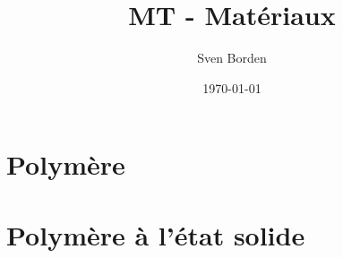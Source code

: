 \documentclass[12pt]{report}
\title{MT - Matériaux}
\author{Sven Borden}
\date{\today}
\begin{document}
	\maketitle	
	\tableofcontents
	\clearpage

	\chapter{Polymère}	
	
	\chapter{Polymère à l'état solide}
	
\end{document}
